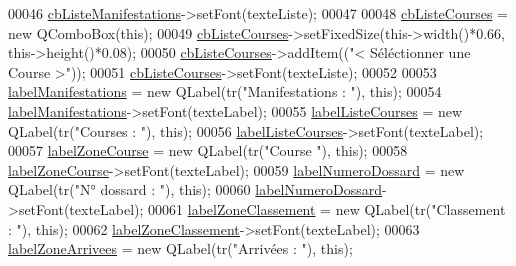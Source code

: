 \begin{DoxyCode}
00046     \hyperlink{class_i_h_m_chrono_cross_a4b7a6af527d8d2d28d8ea6ea7cbfac75}{cbListeManifestations}->setFont(texteListe);
00047 
00048     \hyperlink{class_i_h_m_chrono_cross_af47891e3e9f2bb2c955be8c128e830b5}{cbListeCourses} = \textcolor{keyword}{new} QComboBox(\textcolor{keyword}{this});
00049     \hyperlink{class_i_h_m_chrono_cross_af47891e3e9f2bb2c955be8c128e830b5}{cbListeCourses}->setFixedSize(this->width()*0.66, this->height()*0.08);
00050     \hyperlink{class_i_h_m_chrono_cross_af47891e3e9f2bb2c955be8c128e830b5}{cbListeCourses}->addItem((\textcolor{stringliteral}{"< Séléctionner une Course >"}));
00051     \hyperlink{class_i_h_m_chrono_cross_af47891e3e9f2bb2c955be8c128e830b5}{cbListeCourses}->setFont(texteListe);
00052 
00053     \hyperlink{class_i_h_m_chrono_cross_a7430cf36cc48d17297ddc03fe69e9b72}{labelManifestations} = \textcolor{keyword}{new} QLabel(tr(\textcolor{stringliteral}{"Manifestations : "}), \textcolor{keyword}{this});
00054     \hyperlink{class_i_h_m_chrono_cross_a7430cf36cc48d17297ddc03fe69e9b72}{labelManifestations}->setFont(texteLabel);
00055     \hyperlink{class_i_h_m_chrono_cross_a2b563f2574ad86acaecc01f0357f85be}{labelListeCourses} = \textcolor{keyword}{new} QLabel(tr(\textcolor{stringliteral}{"Courses : "}), \textcolor{keyword}{this});
00056     \hyperlink{class_i_h_m_chrono_cross_a2b563f2574ad86acaecc01f0357f85be}{labelListeCourses}->setFont(texteLabel);
00057     \hyperlink{class_i_h_m_chrono_cross_a7684bc78d49abe63f021ee623bea575e}{labelZoneCourse} = \textcolor{keyword}{new} QLabel(tr(\textcolor{stringliteral}{"Course "}), \textcolor{keyword}{this});
00058     \hyperlink{class_i_h_m_chrono_cross_a7684bc78d49abe63f021ee623bea575e}{labelZoneCourse}->setFont(texteLabel);
00059     \hyperlink{class_i_h_m_chrono_cross_a73afea901ae4b6eb4c0d136818ed1fa6}{labelNumeroDossard} = \textcolor{keyword}{new} QLabel(tr(\textcolor{stringliteral}{"N° dossard : "}), \textcolor{keyword}{this});
00060     \hyperlink{class_i_h_m_chrono_cross_a73afea901ae4b6eb4c0d136818ed1fa6}{labelNumeroDossard}->setFont(texteLabel);
00061     \hyperlink{class_i_h_m_chrono_cross_ac07ff8651a5a929f8847fa85eef9fe89}{labelZoneClassement} = \textcolor{keyword}{new} QLabel(tr(\textcolor{stringliteral}{"Classement : "}), \textcolor{keyword}{this});
00062     \hyperlink{class_i_h_m_chrono_cross_ac07ff8651a5a929f8847fa85eef9fe89}{labelZoneClassement}->setFont(texteLabel);
00063     \hyperlink{class_i_h_m_chrono_cross_a56f6c02a8d3274c4359f12709cefa5d2}{labelZoneArrivees} = \textcolor{keyword}{new} QLabel(tr(\textcolor{stringliteral}{"Arrivées : "}), \textcolor{keyword}{this});

\end{DoxyCode}
